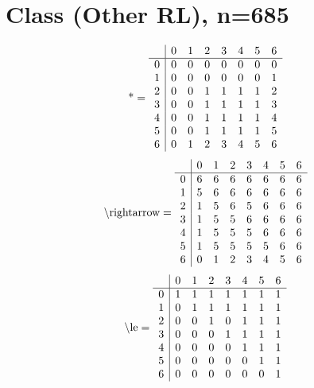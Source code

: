 \documentclass[11pt]{article}
\begin{document}
\section{Class (Other RL), n=685}
\[\text{*} = 
\begin{array}{r | r r r r r r r}
 & 0 & 1 & 2 & 3 & 4 & 5 & 6 \\ \hline
0 & 0 & 0 & 0 & 0 & 0 & 0 & 0 \\
1 & 0 & 0 & 0 & 0 & 0 & 0 & 1 \\
2 & 0 & 0 & 1 & 1 & 1 & 1 & 2 \\
3 & 0 & 0 & 1 & 1 & 1 & 1 & 3 \\
4 & 0 & 0 & 1 & 1 & 1 & 1 & 4 \\
5 & 0 & 0 & 1 & 1 & 1 & 1 & 5 \\
6 & 0 & 1 & 2 & 3 & 4 & 5 & 6 \\
\end{array}
\]
\[\text{\textbackslash rightarrow} = 
\begin{array}{r | r r r r r r r}
 & 0 & 1 & 2 & 3 & 4 & 5 & 6 \\ \hline
0 & 6 & 6 & 6 & 6 & 6 & 6 & 6 \\
1 & 5 & 6 & 6 & 6 & 6 & 6 & 6 \\
2 & 1 & 5 & 6 & 5 & 6 & 6 & 6 \\
3 & 1 & 5 & 5 & 6 & 6 & 6 & 6 \\
4 & 1 & 5 & 5 & 5 & 6 & 6 & 6 \\
5 & 1 & 5 & 5 & 5 & 5 & 6 & 6 \\
6 & 0 & 1 & 2 & 3 & 4 & 5 & 6 \\
\end{array}
\]
\[\text{\textbackslash le} = 
\begin{array}{r | r r r r r r r}
 & 0 & 1 & 2 & 3 & 4 & 5 & 6 \\ \hline
0 & 1 & 1 & 1 & 1 & 1 & 1 & 1 \\
1 & 0 & 1 & 1 & 1 & 1 & 1 & 1 \\
2 & 0 & 0 & 1 & 0 & 1 & 1 & 1 \\
3 & 0 & 0 & 0 & 1 & 1 & 1 & 1 \\
4 & 0 & 0 & 0 & 0 & 1 & 1 & 1 \\
5 & 0 & 0 & 0 & 0 & 0 & 1 & 1 \\
6 & 0 & 0 & 0 & 0 & 0 & 0 & 1 \\
\end{array}
\]
\end{document}
